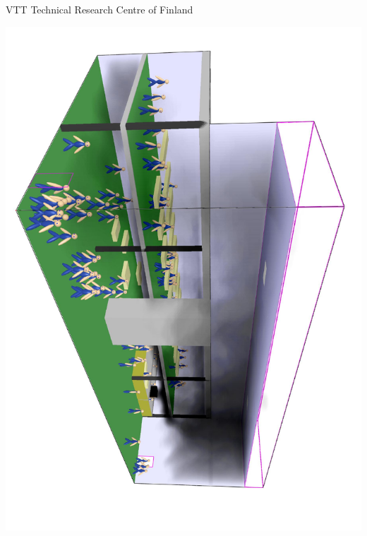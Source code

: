 \documentclass[12pt,a4paper,final,twoside]{stylevk}
\begin{document}


\newcommand{\Timts}[1]{\textnormal{\texttt{\textsl{#1}}}}
\newcommand{\Timtt}[1]{{\tt{#1}}}
\newcommand{\QS}{\hbox{\textquotesingle}}

\fancyhead{}
\fancyfoot[C]{\today}
\renewcommand{\headrulewidth}{0.0pt}
\renewcommand{\footrulewidth}{0.0pt}

\begin{titlepage}

  \thispagestyle{fancy}

  \begin{center}

    VTT Technical Research Centre of Finland

    \vspace{20mm}
   \centerline{\includegraphics[clip=true, angle=90, width=150mm
   ]{FIGURES/KansikuvaAtrium}}  
    \vspace{10mm}


\end{center}
\end{titlepage}
\end{document}
